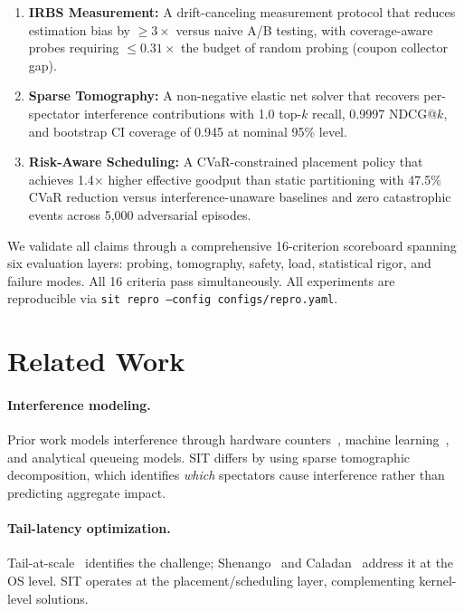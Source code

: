 \documentclass[11pt,twocolumn]{article}
\begin{document}
\begin{enumerate}
\item \textbf{IRBS Measurement:} A drift-canceling measurement protocol
that reduces estimation bias by $\geq 3\times$ versus naive A/B testing,
with coverage-aware probes requiring $\leq 0.31\times$ the budget of
random probing (coupon collector gap).

\item \textbf{Sparse Tomography:} A non-negative elastic net solver that
recovers per-spectator interference contributions with 1.0 top-$k$
recall, 0.9997 NDCG@$k$, and bootstrap CI coverage of 0.945 at
nominal 95\% level.

\item \textbf{Risk-Aware Scheduling:} A CVaR-constrained placement policy
that achieves 1.4$\times$ higher effective goodput than static partitioning
with 47.5\% CVaR reduction versus interference-unaware baselines
and zero catastrophic events across 5,000 adversarial episodes.
\end{enumerate}

We validate all claims through a comprehensive 16-criterion scoreboard
spanning six evaluation layers: probing, tomography, safety, load,
statistical rigor, and failure modes. All 16 criteria pass simultaneously.
All experiments are reproducible via \texttt{sit repro --config configs/repro.yaml}.

\section{Related Work}

\paragraph{Interference modeling.} Prior work models interference through
hardware counters~\cite{mars2011bubble}, machine learning~\cite{delimitrou2014quasar},
and analytical queueing models. SIT differs by using sparse tomographic
decomposition, which identifies \emph{which} spectators cause interference
rather than predicting aggregate impact.

\paragraph{Tail-latency optimization.} Tail-at-scale~\cite{dean2013tail}
identifies the challenge; Shenango~\cite{ousterhout2019shenango} and
Caladan~\cite{fried2020caladan} address it at the OS level. SIT operates
at the placement/scheduling layer, complementing kernel-level solutions.
\end{document}
